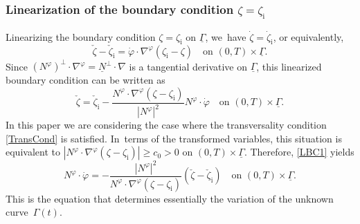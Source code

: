 \documentclass[JEP,XML,SOM,Unicode,NoFloatCountersInSection,published]{cedram}
\newcommand{\ul}[1]{\underline{#1}}
\newcommand{\itGamma}{\mathit{\Gamma}}
\theoremstyle{definition}
\begin{document}
\subsubsection{Linearization of the boundary condition $\zeta=\zeta_\mathrm{i}$}
Linearizing the boundary condition $\zeta=\zeta_\mathrm{i}$ on $\ul{\itGamma}$, we~have $\dot{\zeta}=\dot{\zeta}_\mathrm{i}$, or equivalently,
\[
\check{\zeta}-\check{\zeta}_\mathrm{i} = \dot{\varphi}\cdot\nabla^\varphi(\zeta_\mathrm{i}-\zeta) \quad\text{on } (0,T)\times\ul{\itGamma}.
\]
Since $(N^\varphi)^\perp\cdot\nabla^\varphi=\ul{N}^\perp\cdot\nabla$ is a tangential derivative on $\ul{\itGamma}$,
this linearized boundary condition can be written as
\begin{equation}\label{LBC1}
\check{\zeta}=\check{\zeta}_\mathrm{i}-\frac{N^\varphi\cdot\nabla^\varphi(\zeta-\zeta_\mathrm{i})}{|N^\varphi|^2} N^\varphi\cdot\dot{\varphi}
\quad\text{on } (0,T)\times\ul{\itGamma}.
\end{equation}
In this paper we are considering the case where the transversality condition \eqref{TransCond} is satisfied. In~terms of the transformed variables,
this situation is equivalent to $|N^\varphi\cdot\nabla^\varphi(\zeta-\zeta_\mathrm{i})| \geq c_0>0$ on $(0,T)\times\ul{\itGamma}$.
Therefore, \eqref{LBC1} yields
\begin{equation}\label{EqPhi}
N^\varphi\cdot\dot{\varphi} = -\frac{|N^\varphi|^2}{N^\varphi\cdot\nabla^\varphi(\zeta-\zeta_\mathrm{i})}(\check{\zeta} -\check{\zeta}_\mathrm{i})
\quad\text{on } (0,T)\times\ul{\itGamma}.
\end{equation}
This is the equation that determines essentially the variation of the unknown curve~$\itGamma(t)$.
\end{document}
